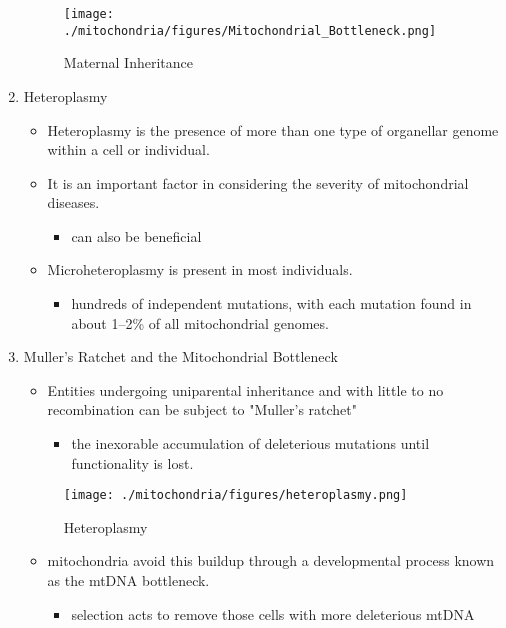 \documentclass{scrartcl}
\begin{document}
\begin{enumerate}
\begin{figure}[htbp]
\centering
\texttt{[image: ./mitochondria/figures/Mitochondrial\_Bottleneck.png]}
\caption[mom]{\label{fig:org7cb5329}
Maternal Inheritance}
\end{figure}

\item Heteroplasmy
\label{sec:org37d66b9}

\begin{itemize}
\item Heteroplasmy is the presence of more than one type of organellar
genome within a cell or individual.

\item It is an important factor in considering the severity of
mitochondrial diseases.
\begin{itemize}
\item can also be beneficial
\end{itemize}

\item Microheteroplasmy is present in most individuals.
\begin{itemize}
\item hundreds of independent mutations, with each mutation found in
about 1–2\% of all mitochondrial genomes.
\end{itemize}
\end{itemize}

\item Muller's Ratchet and the Mitochondrial Bottleneck
\label{sec:org68b96b4}
\begin{itemize}
\item Entities undergoing uniparental inheritance and with little to no
recombination can be subject to "Muller's ratchet"
\begin{itemize}
\item the inexorable accumulation of deleterious mutations until
functionality is lost.
\end{itemize}
\end{itemize}

\begin{figure}[htbp]
\centering
\texttt{[image: ./mitochondria/figures/heteroplasmy.png]}
\caption[heter]{\label{fig:orga45443e}
Heteroplasmy}
\end{figure}

\begin{itemize}
\item mitochondria avoid this buildup through a developmental process
known as the mtDNA bottleneck. 
\begin{itemize}
\item selection acts to remove those cells with more deleterious mtDNA
\end{itemize}
\end{itemize}


\end{enumerate}
\end{document}
